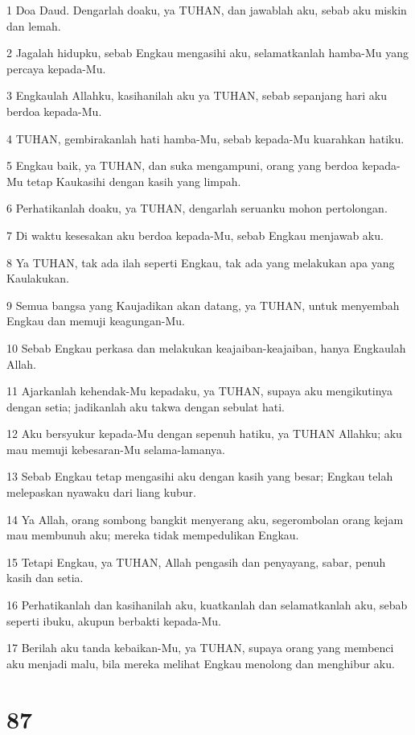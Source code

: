 \par 1 Doa Daud. Dengarlah doaku, ya TUHAN, dan jawablah aku, sebab aku miskin dan lemah.
\par 2 Jagalah hidupku, sebab Engkau mengasihi aku, selamatkanlah hamba-Mu yang percaya kepada-Mu.
\par 3 Engkaulah Allahku, kasihanilah aku ya TUHAN, sebab sepanjang hari aku berdoa kepada-Mu.
\par 4 TUHAN, gembirakanlah hati hamba-Mu, sebab kepada-Mu kuarahkan hatiku.
\par 5 Engkau baik, ya TUHAN, dan suka mengampuni, orang yang berdoa kepada-Mu tetap Kaukasihi dengan kasih yang limpah.
\par 6 Perhatikanlah doaku, ya TUHAN, dengarlah seruanku mohon pertolongan.
\par 7 Di waktu kesesakan aku berdoa kepada-Mu, sebab Engkau menjawab aku.
\par 8 Ya TUHAN, tak ada ilah seperti Engkau, tak ada yang melakukan apa yang Kaulakukan.
\par 9 Semua bangsa yang Kaujadikan akan datang, ya TUHAN, untuk menyembah Engkau dan memuji keagungan-Mu.
\par 10 Sebab Engkau perkasa dan melakukan keajaiban-keajaiban, hanya Engkaulah Allah.
\par 11 Ajarkanlah kehendak-Mu kepadaku, ya TUHAN, supaya aku mengikutinya dengan setia; jadikanlah aku takwa dengan sebulat hati.
\par 12 Aku bersyukur kepada-Mu dengan sepenuh hatiku, ya TUHAN Allahku; aku mau memuji kebesaran-Mu selama-lamanya.
\par 13 Sebab Engkau tetap mengasihi aku dengan kasih yang besar; Engkau telah melepaskan nyawaku dari liang kubur.
\par 14 Ya Allah, orang sombong bangkit menyerang aku, segerombolan orang kejam mau membunuh aku; mereka tidak mempedulikan Engkau.
\par 15 Tetapi Engkau, ya TUHAN, Allah pengasih dan penyayang, sabar, penuh kasih dan setia.
\par 16 Perhatikanlah dan kasihanilah aku, kuatkanlah dan selamatkanlah aku, sebab seperti ibuku, akupun berbakti kepada-Mu.
\par 17 Berilah aku tanda kebaikan-Mu, ya TUHAN, supaya orang yang membenci aku menjadi malu, bila mereka melihat Engkau menolong dan menghibur aku.

\chapter{87}


